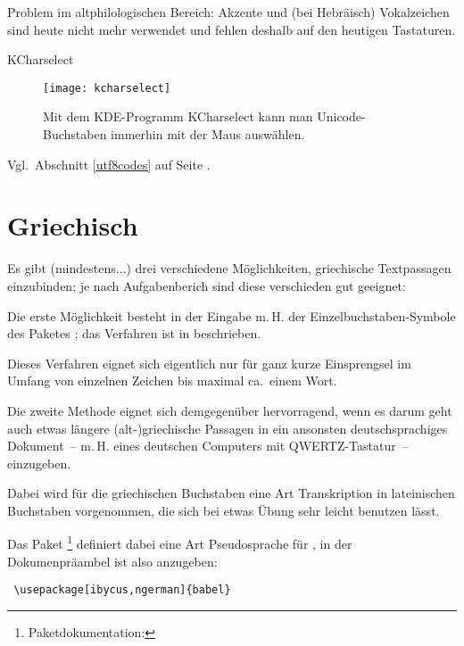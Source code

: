 Problem im altphilologischen Bereich: Akzente und (bei Hebräisch) Vokalzeichen sind heute
nicht mehr verwendet und fehlen deshalb auf den heutigen Tastaturen.

KCharselect

\begin{figure}
 \texttt{[image: kcharselect]}
 \caption{Mit dem KDE-Programm KCharselect kann man Unicode-Buchstaben immerhin mit der Maus
 auswählen.}
\end{figure}


Vgl.\ Abschnitt \ref{utf8codes} auf Seite \pageref{utf8codes}.

\section{Griechisch}

Es gibt (mindestens...) drei verschiedene Möglichkeiten, griechische Textpassagen einzubinden;
je nach Aufgabenberich sind diese verschieden gut geeignet:



Die erste Möglichkeit besteht in der Eingabe m.\,H. der Einzelbuchstaben-Symbole des Paketes
; das Verfahren ist in   beschrieben.

Dieses Verfahren eignet sich eigentlich nur für ganz kurze Einsprengsel im Umfang von
einzelnen Zeichen bis maximal ca.\ einem Wort.



Die zweite Methode eignet sich demgegenüber hervorragend, wenn es darum geht auch etwas
längere (alt-)griechische Passagen in ein ansonsten deutschsprachiges Dokument~-- m.\,H. eines
deutschen Computers mit QWERTZ-Tastatur~-- einzugeben.

Dabei wird für die griechischen Buchstaben eine Art Transkription in lateinischen Buchstaben
vorgenommen, die sich bei etwas Übung sehr leicht benutzen lässt.

Das Paket %
\footnote{Paketdokumentation: }
definiert dabei eine Art Pseudosprache für ,
in der Dokumenpräambel ist also anzugeben:

\begin{lstlisting}
 \usepackage[ibycus,ngerman]{babel}
\end{lstlisting}

